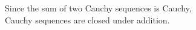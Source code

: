 \documentclass[preview]{standalone}
\begin{document}
\begin{center}
Since the sum of two Cauchy sequences is Cauchy,\\Cauchy sequences are closed under addition.
\end{center}
\end{document}
